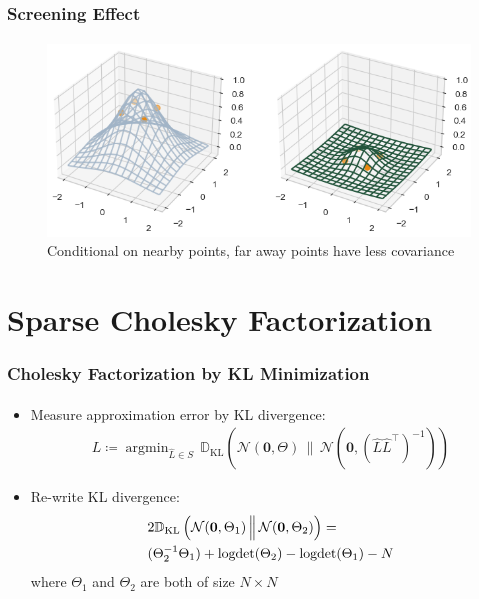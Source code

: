 \documentclass{beamer}                             %
\renewcommand{\vec}[1]{\bm{#1}}
\let\trace\relax
\DeclareMathOperator{\trace}{trace}
\DeclareMathOperator{\logdet}{logdet}
\DeclareMathOperator*{\argmin}{argmin}
\begin{document}
\begin{frame}
\frametitle{Screening Effect}
\framesubtitle{}
\begin{figure}[h!]
  \centering
  \includegraphics[width=\textwidth]{kernel2d.png}
  \caption{Conditional on nearby points, far away points have less covariance}
\end{figure}
\end{frame}

\section{Sparse Cholesky Factorization}

\begin{frame}
\frametitle{Cholesky Factorization by KL Minimization}
\framesubtitle{}
\begin{itemize}
  \item<+-> Measure approximation error by KL divergence:
    \begin{align*}
      L \coloneqq \argmin_{\hat{L} \in S} \, \mathbb{D}_{\text{KL}} \left (
        \mathcal{N}(\vec{0}, \Theta) \, \Big \| \,
        \mathcal{N}(\vec{0}, (\hat{L} \hat{L}^{\top})^{-1})
      \right )
    \end{align*}
  \item<+-> Re-write KL divergence:
    \begin{align*}
      & 2 \mathbb{D}_{\text{KL}}
      \left (
        \mathcal{N}(\vec{0}, \Theta_1) \, \Big \| \,
        \mathcal{N}(\vec{0}, \Theta_2)
      \right ) = \\
      & \trace(\Theta_2^{-1} \Theta_1) +
      \logdet(\Theta_2) - \logdet(\Theta_1) - N
    \end{align*}
    where \( \Theta_1 \) and \( \Theta_2 \) are both of size \( N \times N \)
\end{itemize}
\end{frame}
\end{document}
